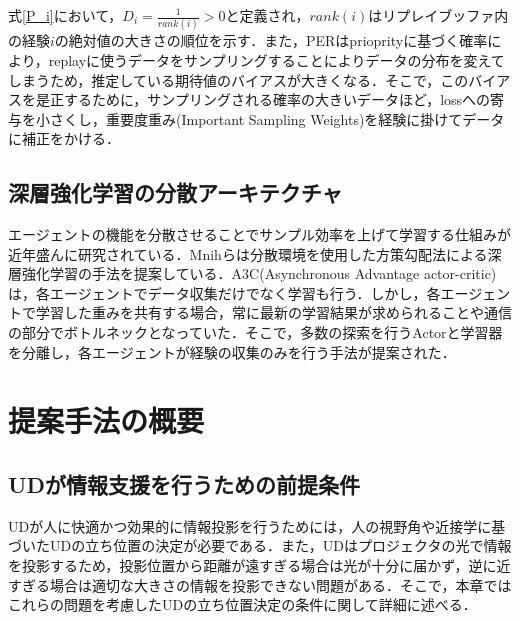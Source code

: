 \documentclass[12pt]{sonota/aislab}
\begin{document}
式\ref{P_i}において，$D_{i}=\frac{1}{rank(i)}>0$と定義され，$rank(i)$はリプレイブッファ内の経験$i$の絶対値の大きさの順位を示す．また，PERはprioprityに基づく確率により，replayに使うデータをサンプリングすることによりデータの分布を変えてしまうため，推定している期待値のバイアスが大きくなる．そこで，このバイアスを是正するために，サンプリングされる確率の大きいデータほど，lossへの寄与を小さくし，重要度重み(Important Sampling Weights)を経験に掛けてデータに補正をかける．

\subsection{深層強化学習の分散アーキテクチャ}
エージェントの機能を分散させることでサンプル効率を上げて学習する仕組みが近年盛んに研究されている\cite{A3C}\cite{Gorila}\cite{Ape-X}．Mnihらは分散環境を使用した方策勾配法による深層強化学習の手法を提案している\cite{A3C}．A3C(Asynchronous Advantage actor-critic)は，各エージェントでデータ収集だけでなく学習も行う．しかし，各エージェントで学習した重みを共有する場合，常に最新の学習結果が求められることや通信の部分でボトルネックとなっていた．そこで，多数の探索を行うActorと学習器を分離し，各エージェントが経験の収集のみを行う手法が提案された\cite{Gorila}\cite{Ape-X}．

\section{提案手法の概要}
\subsection{UDが情報支援を行うための前提条件}\label{投影支援条件}
UDが人に快適かつ効果的に情報投影を行うためには，人の視野角や近接学に基づいたUDの立ち位置の決定が必要である．また，UDはプロジェクタの光で情報を投影するため，投影位置から距離が遠すぎる場合は光が十分に届かず，逆に近すぎる場合は適切な大きさの情報を投影できない問題がある．そこで，本章ではこれらの問題を考慮したUDの立ち位置決定の条件に関して詳細に述べる．
\end{document}
